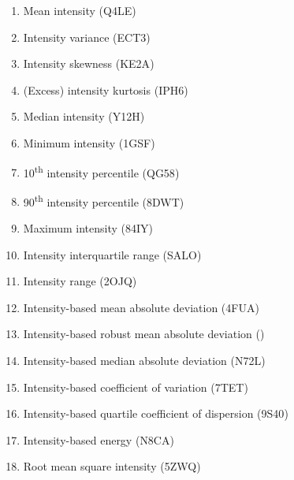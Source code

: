 \documentclass[fleqn,a4paper,oneside,openany]{book}
\newcommand\textid[1]{{\normalsize{\idfont #1}}}
\begin{document}
\begin{enumerate}
        \item Mean intensity (\textid{Q4LE})
        \item Intensity variance (\textid{ECT3})
        \item Intensity skewness (\textid{KE2A})
        \item (Excess) intensity kurtosis (\textid{IPH6})
        \item Median intensity (\textid{Y12H})
        \item Minimum intensity (\textid{1GSF})
        \item 10\textsuperscript{th} intensity percentile (\textid{QG58})
        \item 90\textsuperscript{th} intensity percentile (\textid{8DWT})
        \item Maximum intensity (\textid{84IY})
        \item Intensity interquartile range (\textid{SALO})
        \item Intensity range (\textid{2OJQ})
        \item Intensity-based mean absolute deviation (\textid{4FUA})
        \item Intensity-based robust mean absolute deviation (\textid{1128})
        \item Intensity-based median absolute deviation (\textid{N72L})
        \item Intensity-based coefficient of variation (\textid{7TET})
        \item Intensity-based quartile coefficient of dispersion (\textid{9S40})
        \item Intensity-based energy (\textid{N8CA})
        \item Root mean square intensity (\textid{5ZWQ})

\end{enumerate}
\end{document}
